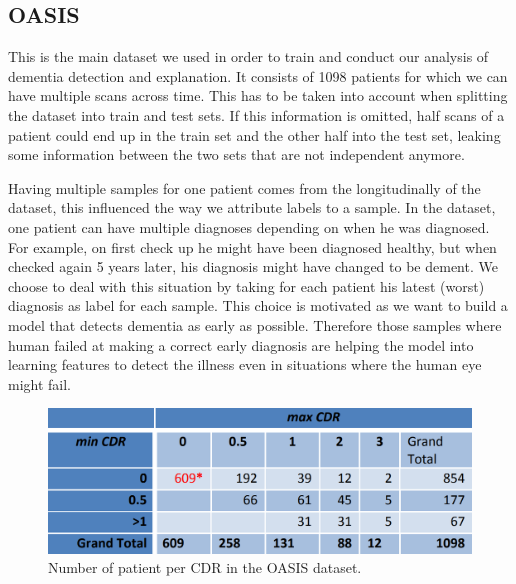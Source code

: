 \subsection{OASIS}
\label{sec:OASIS}
This is the main dataset we used in order to train and conduct our analysis of dementia detection and explanation. It consists of 1098 patients for which we can have multiple scans across time. This has to be taken into account when splitting the dataset into train and test sets. If this information is omitted, half scans of a patient could end up in the train set and the other half into the test set, leaking some information between the two sets that are not independent anymore.


Having multiple samples for one patient comes from the longitudinally of the dataset, this influenced the way we attribute labels to a sample. In the dataset, one patient can have multiple diagnoses depending on when he was diagnosed. For example, on first check up he might have been diagnosed healthy, but when checked again 5 years later, his diagnosis might have changed to be dement. We choose to deal with this situation by taking for each patient his latest (worst) diagnosis as label for each sample. This choice is motivated as we want to build a model that detects dementia as early as possible. Therefore those samples where human failed at making a correct early diagnosis are helping the model into learning features to detect the illness even in situations where the human eye might fail.
\begin{figure}
 \centering
 \includegraphics[width=.9\linewidth]{figures/dataset/OASIS_CDR_table.png}
 \captionsetup{width=.9\linewidth}
 \caption[OASIS_CDR_table]{Number of patient per CDR in the OASIS dataset\footnotemark{}.}
 \label{fig:OASIS_CDR_table}
\end{figure}
